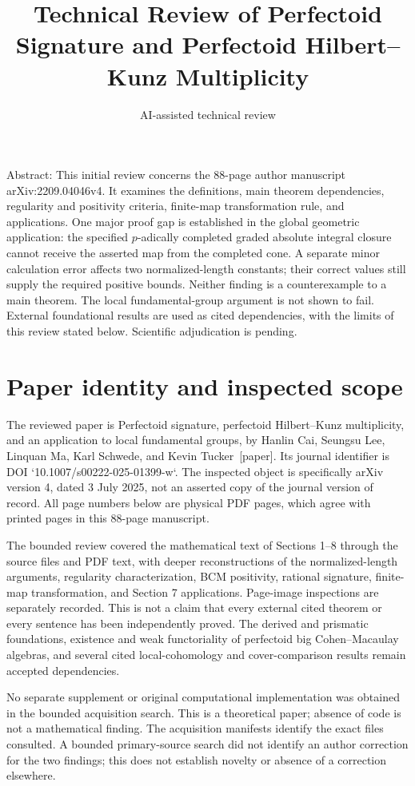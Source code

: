 \documentclass[10pt]{article}
\title{Technical Review of Perfectoid Signature
and Perfectoid Hilbert–Kunz Multiplicity}
\author{AI-assisted technical review}
\date{}
\begin{document}
\maketitle
Abstract: This initial review concerns the 88-page author manuscript arXiv:2209.04046v4. It examines the definitions, main theorem dependencies, regularity and positivity criteria, finite-map transformation rule, and applications. One major proof gap is established in the global geometric application: the specified \(p\)-adically completed graded absolute integral closure cannot receive the asserted map from the completed cone. A separate minor calculation error affects two normalized-length constants; their correct values still supply the required positive bounds. Neither finding is a counterexample to a main theorem. The local fundamental-group argument is not shown to fail. External foundational results are used as cited dependencies, with the limits of this review stated below. Scientific adjudication is pending.\par
\section*{Paper identity and inspected scope}
The reviewed paper is Perfectoid signature, perfectoid Hilbert–Kunz multiplicity, and an application to local fundamental groups, by Hanlin Cai, Seungsu Lee, Linquan Ma, Karl Schwede, and Kevin Tucker [paper]. Its journal identifier is DOI `10.1007/s00222-025-01399-w`. The inspected object is specifically arXiv version 4, dated 3 July 2025, not an asserted copy of the journal version of record. All page numbers below are physical PDF pages, which agree with printed pages in this 88-page manuscript.\par
The bounded review covered the mathematical text of Sections 1–8 through the source files and PDF text, with deeper reconstructions of the normalized-length arguments, regularity characterization, BCM positivity, rational signature, finite-map transformation, and Section 7 applications. Page-image inspections are separately recorded. This is not a claim that every external cited theorem or every sentence has been independently proved. The derived and prismatic foundations, existence and weak functoriality of perfectoid big Cohen–Macaulay algebras, and several cited local-cohomology and cover-comparison results remain accepted dependencies.\par
No separate supplement or original computational implementation was obtained in the bounded acquisition search. This is a theoretical paper; absence of code is not a mathematical finding. The acquisition manifests identify the exact files consulted. A bounded primary-source search did not identify an author correction for the two findings; this does not establish novelty or absence of a correction elsewhere.\par
\end{document}
